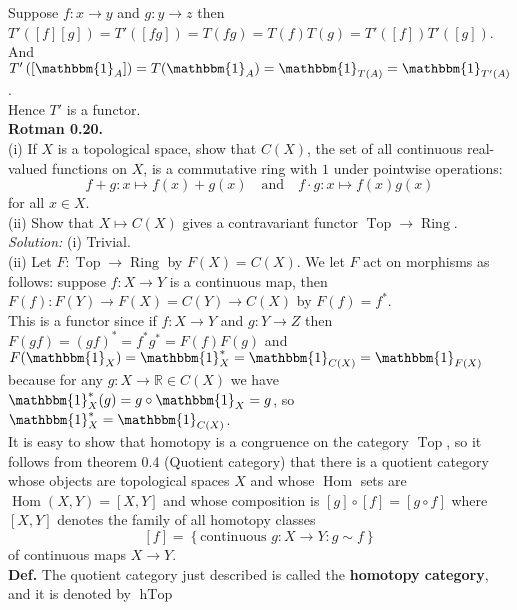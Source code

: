\documentclass[a4paper]{article}
\theoremstyle{plain}%
\theoremstyle{definition}
\theoremstyle{remark}
\DeclareMathOperator{\Hom}{Hom}
\DeclareMathOperator{\Ring}{Ring}
\DeclareMathOperator{\Top}{Top}
\DeclareMathOperator{\hTop}{hTop}
\begin{document}
\linebreak
Suppose $f  \colon x \to y$ and
$g  \colon y \to z$ then
$T' \left( \left[ f \right] \left[ g \right]  \right) 
= T'\left( \left[ fg \right]  \right) 
= T(fg) = T(f) T(g)
= T'\left( \left[ f \right]  \right) 
T'\left( \left[ g \right]  \right) $.\\
And 
$T' \left( \left[ \mathbbm{1}_A \right]  \right) 
= T(\mathbbm{1}_A) = 
\mathbbm{1}_{T(A)}
= \mathbbm{1}_{T'(A)}$.\\
\linebreak
Hence $T'$ is a functor.\\
\linebreak
\textbf{Rotman 0.20.}\\
(i) If $X$ is a topological space, show that $C(X)$, the set of all continuous
real-valued functions on $X$, is a commutative ring with $1$ under pointwise
operations:
\[
f+g   \colon x \mapsto f(x) + g(x) \quad \text{and} \quad 
f \cdot g  \colon x \mapsto f(x) g(x)
\] 
for all $x \in X$.\\
(ii) Show that $X \mapsto C(X)$ gives a contravariant functor
$\Top \to \Ring$.\\
\linebreak
\textit{Solution:} 
(i) Trivial.\\
(ii) Let $F  \colon \Top \to \Ring$ by
$F(X) = C(X)$. We let $F$ act on morphisms
as follows: suppose
$f  \colon X \to Y$ is a continuous map, then
$F(f)  \colon F(Y) \to F(X) = C(Y) \to C(X)$ by
$F(f) = f^*$.\\
\linebreak
This is a functor since
if $f  \colon X \to Y$ and $g  \colon Y \to Z$ then
$F(gf) = (gf)^* = f^* g^* = F(f) F(g)
$ 
and $F(\mathbbm{1}_X) = 
\mathbbm{1}_{X}^{*} =
\mathbbm{1}_{C(X)}= \mathbbm{1}_{F(X)}$ because
for any $g  \colon X \to \mathbb{R} \in C(X)$ we have
$\mathbbm{1}_{X}^{*}(g) = 
g \circ \mathbbm{1}_X
= g$, so $\mathbbm{1}_{X}^{*}= \mathbbm{1}_{C(X)}$.\\
\linebreak
It is easy to show that 
homotopy is a congruence on the category $\Top$, so
it follows from theorem 0.4 (Quotient category) that there is a quotient
category whose objects are topological spaces $X$ and whose $\Hom$ sets
are $\Hom (X,Y) = \left[ X,Y \right] $ and whose composition is 
$\left[ g \right] \circ \left[ f \right] 
= \left[ g \circ f \right] $ where 
$\left[ X,Y \right] $ denotes the family of all homotopy classes 
\[
\left[ f \right] = \left\{ \text{continuous }g
 \colon X \to Y  \colon g \sim f\right\} 
\] 
of continuous maps $X \to Y$.\\
\linebreak
\textbf{Def.} The quotient category just described is called the
\textbf{homotopy category}, and it is denoted by
$\hTop$
\end{document}
